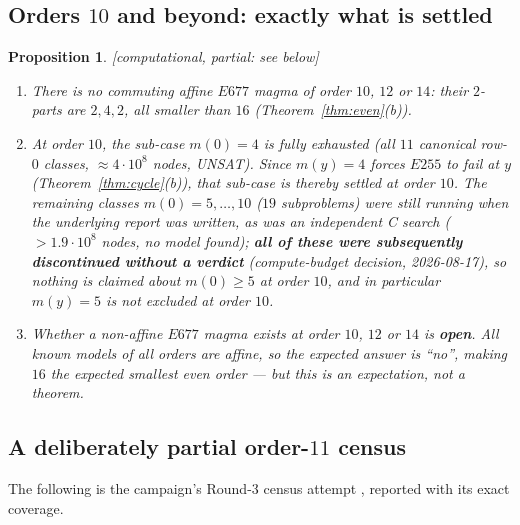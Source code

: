 \documentclass[11pt]{article}
\theoremstyle{plain}
\newtheorem{proposition}[theorem]{Proposition}
\theoremstyle{definition}
\theoremstyle{remark}
\numberwithin{equation}{section}
\newcommand{\statusbox}[1]{{\small\sloppy\textsf{[#1]}}}
\newcommand{\PARTIAL}[1]{\statusbox{computational, partial: #1}}
\begin{document}
\subsection{Orders $10$ and beyond: exactly what is settled}

\begin{proposition}\label{prop:n10}
\PARTIAL{see below}
\begin{enumerate}
\item[(a)] There is no \emph{commuting affine} $E677$ magma of order $10$, $12$ or $14$: their
$2$-parts are $2,4,2$, all smaller than $16$ (Theorem~\ref{thm:even}(b)).
\item[(b)] At order $10$, the sub-case $m(0) = 4$ is fully exhausted (all $11$ canonical
row-$0$ classes, $\approx 4\cdot10^8$ nodes, UNSAT). Since $m(y) = 4$ \emph{forces} $E255$ to
fail at $y$ (Theorem~\ref{thm:cycle}(b)), that sub-case is thereby settled at order $10$. The
remaining classes $m(0) = 5,\dots,10$ ($19$ subproblems) were still running when the
underlying report was written, as was an independent C search
($>1.9\cdot10^8$ nodes, no model found); \textbf{all of these were subsequently discontinued
without a verdict} (compute-budget decision, 2026-08-17), so \emph{nothing} is claimed about
$m(0)\ge5$ at order $10$, and in particular $m(y)=5$ is \emph{not} excluded at order $10$.
\item[(c)] Whether a \emph{non-affine} $E677$ magma exists at order $10$, $12$ or $14$ is
\textbf{open}. All known models of all orders are affine, so the expected answer is ``no'',
making $16$ the expected smallest even order --- but this is an expectation, not a theorem.
\end{enumerate}
\end{proposition}

\subsection{A deliberately partial order-$11$ census}\label{sec:census11}

The following is the campaign's Round-3 census attempt \cite{R3F}, reported with its exact
coverage.
\end{document}
